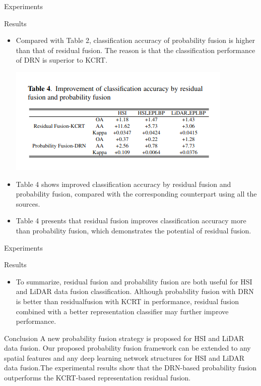 \documentclass{beamer}
\begin{document}
\begin{frame}{Experiments}
    \begin{block}{Results}
        \begin{itemize}
            \item Compared with Table 2, classification accuracy of probability fusion is higher than that of residual fusion.  The reason is that the classification performance of DRN is superior to KCRT.
            \begin{center}
                \includegraphics[scale=0.4]{table4}
            \end{center}
            \item Table 4 shows improved classification accuracy by residual fusion and probability fusion,  compared with the corresponding counterpart using all the sources.
            \item Table 4 presents that  residual  fusion  improves  classification  accuracy  more than probability fusion, which demonstrates the potential of residual fusion.
        \end{itemize}
    \end{block}
\end{frame}

\begin{frame}{Experiments}
    \begin{block}{Results}
        \begin{itemize}
            \item To summarize, residual fusion and probability fusion are both useful for HSI and LiDAR data fusion classification. Although  probability  fusion  with  DRN is  better  than  residualfusion with KCRT in performance, residual fusion combined with  a  better  representation classifier  may  further  improve performance.
        \end{itemize}
    \end{block}
\end{frame}

\begin{frame}{Conclusion}
    A  new  probability  fusion  strategy  is  proposed  for  HSI  and LiDAR data fusion.  Our proposed probability fusion framework  can  be  extended  to  any  spatial  features  and  any  deep learning network structures for HSI and LiDAR data fusion.The experimental results show that the DRN-based probability fusion outperforms the KCRT-based representation residual fusion.
\end{frame}
\end{document}
